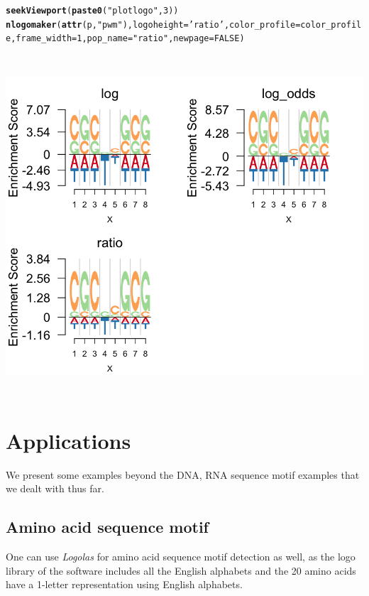 \documentclass[12pt]{article}\usepackage[]{graphicx}\usepackage[usenames,dvipsnames]{color}
\makeatletter
\newcommand{\hlnum}[1]{\textcolor[rgb]{0.686,0.059,0.569}{#1}}%
\newcommand{\hlstr}[1]{\textcolor[rgb]{0.192,0.494,0.8}{#1}}%
\newcommand{\hlstd}[1]{\textcolor[rgb]{0.345,0.345,0.345}{#1}}%
\newcommand{\hlkwc}[1]{\textcolor[rgb]{0.333,0.667,0.333}{#1}}%
\newcommand{\hlkwd}[1]{\textcolor[rgb]{0.737,0.353,0.396}{\textbf{#1}}}%
\newenvironment{kframe}{%
 \def\at@end@of@kframe{}%
 \ifinner\ifhmode%
  \def\at@end@of@kframe{\end{minipage}}%
  \begin{minipage}{\columnwidth}%
 \fi\fi%
 \def\FrameCommand##1{\hskip\@totalleftmargin \hskip-\fboxsep
 \colorbox{shadecolor}{##1}\hskip-\fboxsep
     \hskip-\linewidth \hskip-\@totalleftmargin \hskip\columnwidth}%
 \MakeFramed {\advance\hsize-\width
   \@totalleftmargin\z@ \linewidth\hsize
   \@setminipage}}%
 {\par\unskip\endMakeFramed%
 \at@end@of@kframe}
\newenvironment{knitrout}{}{} %
\newcommand{\Logolas}{\textit{Logolas}}
\makeatother
\begin{document}
\begin{knitrout}
\begin{kframe}
\begin{alltt}
\hlkwd{seekViewport}\hlstd{(}\hlkwd{paste0}\hlstd{(}\hlstr{"plotlogo"}\hlstd{,} \hlnum{3}\hlstd{))}
\hlkwd{nlogomaker}\hlstd{(}\hlkwd{attr}\hlstd{(p,} \hlstr{"pwm"}\hlstd{),}\hlkwc{logoheight} \hlstd{=} \hlstr{'ratio'}\hlstd{,}\hlkwc{color_profile} \hlstd{= color_profile,}\hlkwc{frame_width} \hlstd{=} \hlnum{1}\hlstd{,} \hlkwc{pop_name} \hlstd{=} \hlstr{"ratio"}\hlstd{,} \hlkwc{newpage} \hlstd{=} \hlnum{FALSE}\hlstd{)}
\end{alltt}
\end{kframe}
\includegraphics[width=6in,height=5in]{figure/edlogo_opts-1} 

\end{knitrout}



\section{Applications}

We present some examples beyond the DNA, RNA sequence motif examples that we dealt with thus far.

\subsection{Amino acid sequence motif}

One can use \Logolas{} for amino acid sequence motif detection as well, as the logo library of the software includes all the English alphabets and the 20 amino acids have a 1-letter representation using English alphabets.
\end{document}
